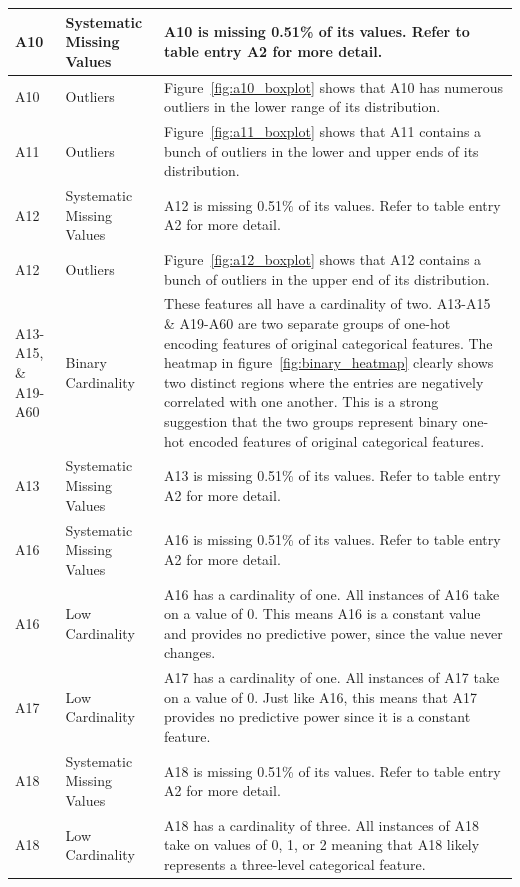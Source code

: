 \documentclass[11pt]{report}
\begin{document}
\begin{longtable}{lp{5cm}p{8cm}}
\midrule
A10 & Systematic Missing Values & A10 is missing 0.51\% of its values.  Refer to table entry A2 for more detail. \\
\midrule
A10 & Outliers & Figure~\ref{fig:a10_boxplot} shows that A10 has numerous outliers in the lower range of its distribution. \\
\midrule
A11 & Outliers & Figure~\ref{fig:a11_boxplot} shows that A11 contains a bunch of outliers in the lower and upper ends of its distribution. \\
\midrule
A12 & Systematic Missing Values & A12 is missing 0.51\% of its values.  Refer to table entry A2 for more detail. \\
\midrule
A12 & Outliers & Figure~\ref{fig:a12_boxplot} shows that A12 contains a bunch of outliers in the upper end of its distribution. \\
\midrule
A13-A15, \& A19-A60 & Binary Cardinality & These features all have a cardinality of two. A13-A15 \& A19-A60 are two separate groups of one-hot encoding features of original categorical features. The heatmap in figure~\ref{fig:binary_heatmap} clearly shows two distinct regions where the entries are negatively correlated with one another. This is a strong suggestion that the two groups represent binary one-hot encoded features of original categorical features. \\
\midrule
A13 & Systematic Missing Values & A13 is missing 0.51\% of its values.  Refer to table entry A2 for more detail. \\
\midrule
A16 & Systematic Missing Values & A16 is missing 0.51\% of its values.  Refer to table entry A2 for more detail. \\
\midrule
A16 & Low Cardinality & A16 has a cardinality of one. All instances of A16 take on a value of 0. This means A16 is a constant value and provides no predictive power, since the value never changes. \\
\midrule
A17 & Low Cardinality & A17 has a cardinality of one. All instances of A17 take on a value of 0. Just like A16, this means that A17 provides no predictive power since it is a constant feature. \\ 
\midrule
A18 & Systematic Missing Values & A18 is missing 0.51\% of its values.  Refer to table entry A2 for more detail. \\
\midrule
A18 & Low Cardinality & A18 has a cardinality of three. All instances of A18 take on values of 0, 1, or 2 meaning that A18 likely represents a three-level categorical feature. \\

\end{longtable}
\end{document}
